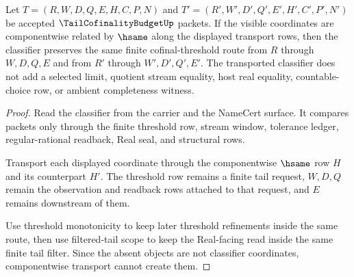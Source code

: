 \begin{theorem}
\label{thm:tail-cofinality-budget-obligation-classifier}
Let $T=(R,W,D,Q,E,H,C,P,N)$ and $T'=(R',W',D',Q',E',H',C',P',N')$ be accepted $\TailCofinalityBudgetUp$ packets. If the visible coordinates are componentwise related by $\hsame$ along the displayed transport rows, then the classifier preserves the same finite cofinal-threshold route from $R$ through $W,D,Q,E$ and from $R'$ through $W',D',Q',E'$. The transported classifier does not add a selected limit, quotient stream equality, host real equality, countable-choice row, or ambient completeness witness.
\end{theorem}
\begin{proof}
Read the classifier from the carrier and the NameCert surface. It compares packets only through the finite threshold row, stream window, tolerance ledger, regular-rational readback, Real seal, and structural rows.

Transport each displayed coordinate through the componentwise $\hsame$ row $H$ and its counterpart $H'$. The threshold row remains a finite tail request, $W,D,Q$ remain the observation and readback rows attached to that request, and $E$ remains downstream of them.

Use threshold monotonicity to keep later threshold refinements inside the same route, then use filtered-tail scope to keep the Real-facing read inside the same finite tail filter. Since the absent objects are not classifier coordinates, componentwise transport cannot create them.
\end{proof}

